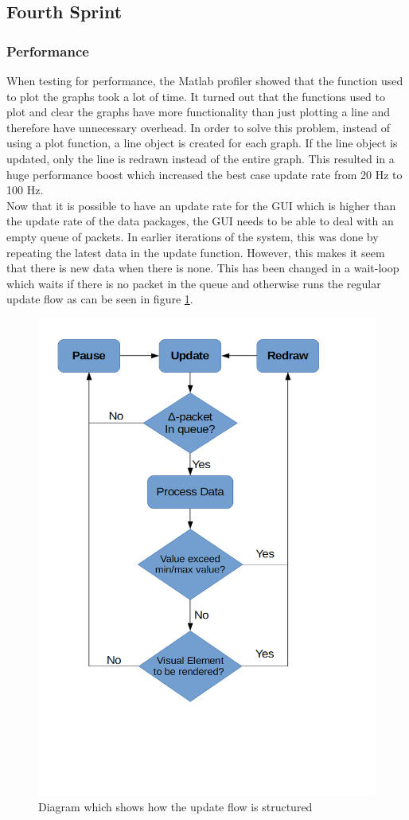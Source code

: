 \subsection{Fourth Sprint}


\subsubsection{Performance}
When testing for performance, the Matlab profiler showed that the function used to plot the graphs took a lot of time. It turned out that the functions used to plot and clear the graphs have more functionality than just plotting a line and therefore have 	unnecessary overhead. In order to solve this problem, instead of using a plot function, a line object is created for each graph. If the line object is updated, only the line is redrawn instead of the entire graph. This resulted in a huge performance boost which increased the best case update rate from 20 Hz to 100 Hz.\\

Now that it is possible to have an update rate for the GUI which is higher than the update rate of the data packages, the GUI needs to be able to deal with an empty queue of packets. In earlier iterations of the system, this was done by repeating the latest data in the update function. However, this makes it seem that there is new data when there is none. This has been changed in a wait-loop which waits if there is no packet in the queue and otherwise runs the regular update flow as can be seen in figure \ref{fig:UpdateFlow}. 
\begin{figure}[H]
	\centering
	\includegraphics[width=.75\textwidth]{images/UpdateFlow}
	\caption{Diagram which shows how the update flow is structured} 
	\label{fig:UpdateFlow}
\end{figure} 
